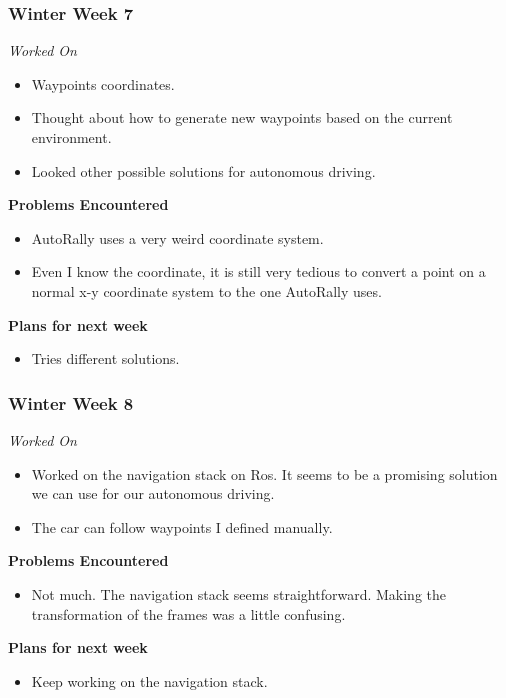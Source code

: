 \documentclass[compsoc,draftclsnofoot,onecolumn,10pt]{IEEEtran}
\begin{document}
\subsubsection*{Winter Week 7}
\textit{Worked On}
\begin{itemize}
    \item Waypoints coordinates.
    \item Thought about how to generate new waypoints based on the current environment.
    \item Looked other possible solutions for autonomous driving.
\end{itemize}
\textbf{Problems Encountered}
\begin{itemize}
  \item AutoRally uses a very weird coordinate system.
  \item Even I know the coordinate, it is still very tedious to convert a point on a normal x-y coordinate system to the one AutoRally uses.
\end{itemize}
\textbf{Plans for next week}
\begin{itemize}
  \item Tries different solutions.
\end{itemize}



\subsubsection*{Winter Week 8}
\textit{Worked On}
\begin{itemize}
    \item Worked on the navigation stack on Ros. It seems to be a promising solution we can use for our autonomous driving.
    \item The car can follow waypoints I defined manually.
\end{itemize}
\textbf{Problems Encountered}
\begin{itemize}
  \item Not much. The navigation stack seems straightforward. Making the transformation of the frames was a little confusing.
\end{itemize}
\textbf{Plans for next week}
\begin{itemize}
  \item Keep working on the navigation stack.
\end{itemize}
\end{document}
